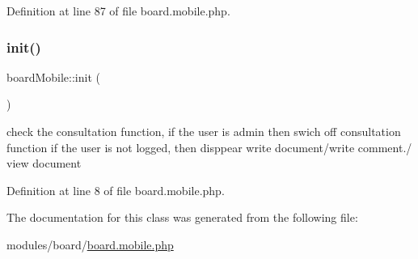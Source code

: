 Definition at line 87 of file board.\+mobile.\+php.

\mbox{\label{classboardMobile_ab403b1f5b76033b26e461fc483c2216b}} 
\subsubsection{\texorpdfstring{init()}{init()}}
{\footnotesize\ttfamily board\+Mobile\+::init (\begin{DoxyParamCaption}{ }\end{DoxyParamCaption})}

check the consultation function, if the user is admin then swich off consultation function if the user is not logged, then disppear write document/write comment./ view document

Definition at line 8 of file board.\+mobile.\+php.



The documentation for this class was generated from the following file\+:\begin{DoxyCompactItemize}
\item 
modules/board/\hyperlink{board_8mobile_8php}{board.\+mobile.\+php}\end{DoxyCompactItemize}
